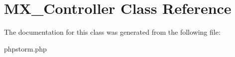 \hypertarget{class_m_x___controller}{}\section{M\+X\+\_\+\+Controller Class Reference}
\label{class_m_x___controller}


The documentation for this class was generated from the following file\+:\begin{DoxyCompactItemize}
\item 
phpstorm.\+php\end{DoxyCompactItemize}
